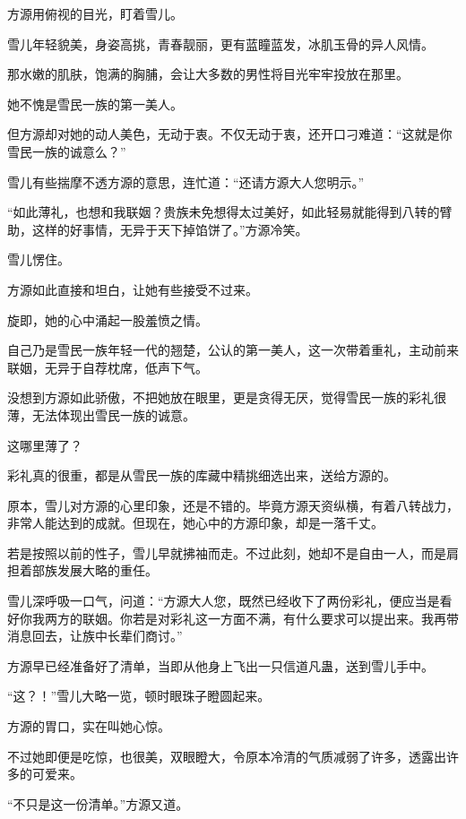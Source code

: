 
\begin{this_body}

方源用俯视的目光，盯着雪儿。

雪儿年轻貌美，身姿高挑，青春靓丽，更有蓝瞳蓝发，冰肌玉骨的异人风情。

那水嫩的肌肤，饱满的胸脯，会让大多数的男性将目光牢牢投放在那里。

她不愧是雪民一族的第一美人。

但方源却对她的动人美色，无动于衷。不仅无动于衷，还开口刁难道：“这就是你雪民一族的诚意么？”

雪儿有些揣摩不透方源的意思，连忙道：“还请方源大人您明示。”

“如此薄礼，也想和我联姻？贵族未免想得太过美好，如此轻易就能得到八转的臂助，这样的好事情，无异于天下掉馅饼了。”方源冷笑。

雪儿愣住。

方源如此直接和坦白，让她有些接受不过来。

旋即，她的心中涌起一股羞愤之情。

自己乃是雪民一族年轻一代的翘楚，公认的第一美人，这一次带着重礼，主动前来联姻，无异于自荐枕席，低声下气。

没想到方源如此骄傲，不把她放在眼里，更是贪得无厌，觉得雪民一族的彩礼很薄，无法体现出雪民一族的诚意。

这哪里薄了？

彩礼真的很重，都是从雪民一族的库藏中精挑细选出来，送给方源的。

原本，雪儿对方源的心里印象，还是不错的。毕竟方源天资纵横，有着八转战力，非常人能达到的成就。但现在，她心中的方源印象，却是一落千丈。

若是按照以前的性子，雪儿早就拂袖而走。不过此刻，她却不是自由一人，而是肩担着部族发展大略的重任。

雪儿深呼吸一口气，问道：“方源大人您，既然已经收下了两份彩礼，便应当是看好你我两方的联姻。你若是对彩礼这一方面不满，有什么要求可以提出来。我再带消息回去，让族中长辈们商讨。”

方源早已经准备好了清单，当即从他身上飞出一只信道凡蛊，送到雪儿手中。

“这？！”雪儿大略一览，顿时眼珠子瞪圆起来。

方源的胃口，实在叫她心惊。

不过她即便是吃惊，也很美，双眼瞪大，令原本冷清的气质减弱了许多，透露出许多的可爱来。

“不只是这一份清单。”方源又道。


\end{this_body}
